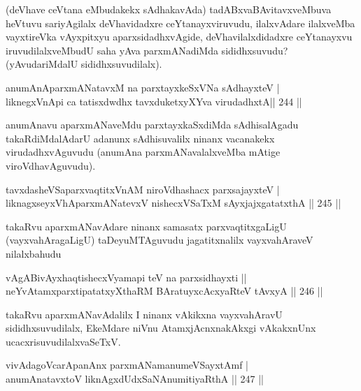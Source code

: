 \begin{artha}
(deVhave ceVtana eMbudakekx sAdhakavAda) tadABxvaBAvitavxveMbuva heVtuvu sariyAgilalx deVhavidadxre ceYtanayxviruvudu, ilalxvAdare ilalxveMba vayxtireVka vAyxpitxyu aparxsidadhxvAgide, deVhavilalxdidadxre ceYtanayxvu iruvudilalxveMbudU saha yAva parxmANadiMda sididhxsuvudu? (yAvudariMdalU sididhxsuvudilalx).
\end{artha}

\begin{shl}
anumAnAparxmANatavxM na parxtayxkeSxVNa sAdhayxteV | \\
liknegxVnApi ca tatisxdwdhx tavxduketxyXYva virudadhxtA\hfill  ||  244 ||  
\end{shl}

\begin{artha}
anumAnavu aparxmANaveMdu parxtayxkaSxdiMda sAdhisalAgadu takaRdiMdalAdarU adanunx sAdhisuvalilx ninanx vacanakekx virudadhxvAguvudu (anumAna parxmANavalalxveMba mAtige viroVdhavAguvudu).
\end{artha}

\begin{shl}
tavxdasheVSaparxvaqtitxVnAM niroVdhashacx parxsajayxteV | \\
liknagxseyxVhAparxmANatevxV nishecxVSaTxM sAyxjajxgatatxthA \hfill ||  245 ||  
\end{shl}

\begin{artha}
takaRvu aparxmANavAdare ninanx samasatx parxvaqtitxgaLigU (vayxvahAragaLigU) taDeyuMTAguvudu jagatitxnalilx vayxvahAraveV nilalxbahudu
\end{artha}

\begin{shl}
vAgABivAyxhaqtishecxVyamapi teV na parxsidhayxti ||  \\
neYvA\s \s tamxparxtipatatxyXthaRM BAratuyxcAcxyaRteV tAvxyA \hfill ||  246 || 
\end{shl}

\begin{artha}
takaRvu aparxmANavAdalilx I ninanx vAkikxna vayxvahAravU sididhxsuvudilalx, EkeMdare niVnu AtamxjAcnxnakAkxgi vAkakxnUnx ucacxrisuvudilalxvaSeTxV.
\end{artha}


\begin{shl}
\footnotemark[1]{}vivAdagoVcarApanAnx parxmANamanumeVSayxtAmf | \\
anumAnatavxtoV liknAgxdUdxSaNAnumitiyaRthA \hfill ||  247 ||  
\end{shl}

